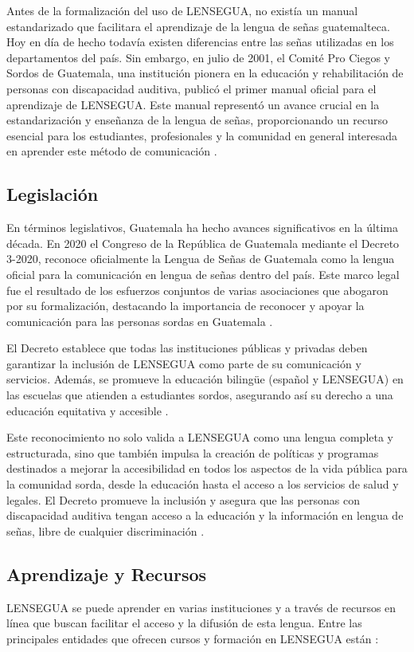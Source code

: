 Antes de la formalización del uso de LENSEGUA, no existía un manual estandarizado que facilitara el aprendizaje de la lengua de señas guatemalteca. Hoy en día de hecho todavía existen diferencias entre las señas utilizadas en los departamentos del país. Sin embargo, en julio de 2001, el Comité Pro Ciegos y Sordos de Guatemala, una institución pionera en la educación y rehabilitación de personas con discapacidad auditiva, publicó el primer manual oficial para el aprendizaje de LENSEGUA. Este manual representó un avance crucial en la estandarización y enseñanza de la lengua de señas, proporcionando un recurso esencial para los estudiantes, profesionales y la comunidad en general interesada en aprender este método de comunicación \cite{deLeon2021}.

\subsection{Legislación}
En términos legislativos, Guatemala ha hecho avances significativos en la última década. En 2020 el Congreso de la República de Guatemala mediante el Decreto 3-2020, reconoce oficialmente la Lengua de Señas de Guatemala como la lengua oficial para la comunicación en lengua de señas dentro del país. Este marco legal fue el resultado de los esfuerzos conjuntos de varias asociaciones que abogaron por su formalización, destacando la importancia de reconocer y apoyar la comunicación para las personas sordas en Guatemala \cite{CongresoGuatemala2020} .

El Decreto establece que todas las instituciones públicas y privadas deben garantizar la inclusión de LENSEGUA como parte de su comunicación y servicios. Además, se promueve la educación bilingüe (español y LENSEGUA) en las escuelas que atienden a estudiantes sordos, asegurando así su derecho a una educación equitativa y accesible \cite{CongresoGuatemala2020}.

Este reconocimiento no solo valida a LENSEGUA como una lengua completa y estructurada, sino que también impulsa la creación de políticas y programas destinados a mejorar la accesibilidad en todos los aspectos de la vida pública para la comunidad sorda, desde la educación hasta el acceso a los servicios de salud y legales. El Decreto promueve la inclusión y asegura que las personas con discapacidad auditiva tengan acceso a la educación y la información en lengua de señas, libre de cualquier discriminación \cite{CongresoGuatemala2020}.

\subsection{Aprendizaje y Recursos}
LENSEGUA se puede aprender en varias instituciones y a través de recursos en línea que buscan facilitar el acceso y la difusión de esta lengua. Entre las principales entidades que ofrecen cursos y formación en LENSEGUA están \cite{LenseguaSF}:

